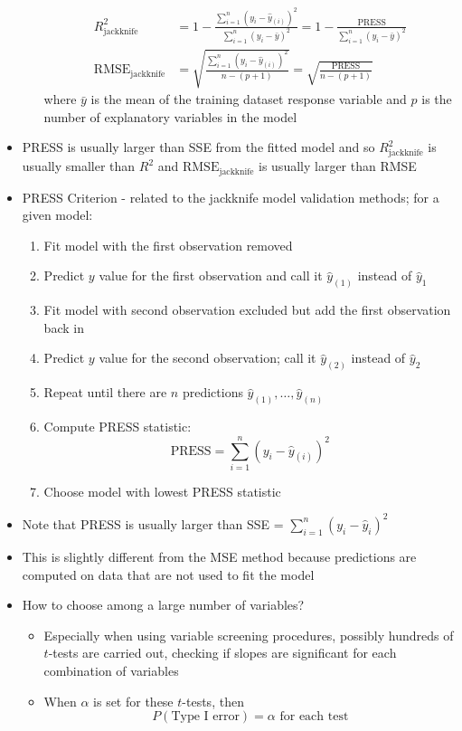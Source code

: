 \documentclass[12pt]{article}
\begin{document}
\begin{itemize}
\begin{enumerate}
$$\begin{aligned}
R^2_{\text{jackknife}} &= 1 - \frac{\sum_{i=1}^n (y_i - \hat{y}_{(i)})^2}{\sum_{i=1}^n (y_i - \bar{y})^2} = 1 - \frac{\text{PRESS}}{\sum_{i=1}^n (y_i - \bar{y})^2} \\ \text{RMSE}_{\text{jackknife}} &= \sqrt{ \frac{\sum_{i=1}^n (y_i - \hat{y}_{(i)})^2}{n-(p+1)}} = \sqrt{\frac{\text{PRESS}}{n-(p+1)}} \end{aligned} $$ where $\bar{y}$ is the mean of the training dataset response variable and $p$ is the number of explanatory variables in the model \end{enumerate} 
\item PRESS is usually larger than SSE from the fitted model and so $R^2_{\text{jackknife}}$ is usually smaller than $R^2$ and $\text{RMSE}_{\text{jackknife}}$ is usually larger than RMSE 
\item PRESS Criterion - related to the jackknife model validation methods; for a given model: \begin{enumerate} 
\item Fit model with the first observation removed 
\item Predict $y$ value for the first observation and call it $\hat{y}_{(1)}$ instead of $\hat{y}_1$ 
\item Fit model with second observation excluded but add the first observation back in 
\item Predict $y$ value for the second observation; call it $\hat{y}_{(2)}$ instead of $\hat{y}_2$ 
\item Repeat until there are $n$ predictions $\hat{y}_{(1)},\dots,\hat{y}_{(n)}$
\item Compute PRESS statistic: $$ \text{PRESS} = \sum_{i=1}^n (y_i - \hat{y}_{(i)})^2 $$
\item Choose model with lowest PRESS statistic \end{enumerate} 
\item Note that PRESS is usually larger than SSE = $\sum_{i=1}^n (y_i - \hat{y}_i)^2$ 
\item This is slightly different from the MSE method because predictions are computed on data that are not used to fit the model 
\item How to choose among a large number of variables? \begin{itemize} 
\item Especially when using variable screening procedures, possibly hundreds of $t$-tests are carried out, checking if slopes are significant for each combination of variables 
\item When $\alpha$ is set for these $t$-tests, then $$ P(\text{Type I error}) = \alpha \text{ for each test} $$ 

\end{itemize}
\end{itemize}
\end{document}
